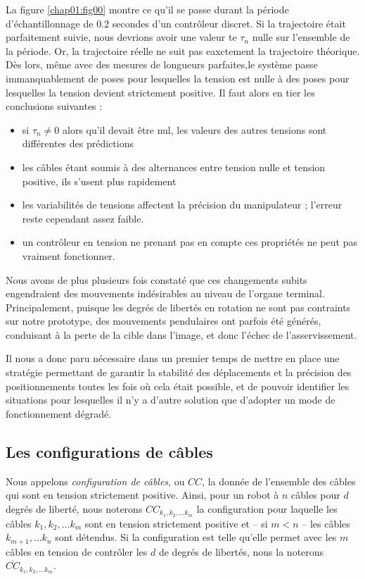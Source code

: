 La figure \ref{chap01:fig00} montre ce qu'il se passe durant la période 
d'échantillonnage de $0.2$ secondes d'un contrôleur discret. Si la trajectoire 
était parfaitement suivie, nous devrions avoir une valeur te $\tau_n$ nulle sur 
l'ensemble de la période. Or, la trajectoire réelle ne suit pas eaxctement la 
trajectoire théorique. Dès lors, même avec des mesures de longueurs parfaites,le 
système passe immanquablement de poses pour lesquelles la tension est nulle à 
des poses pour lesquelles la tension devient strictement positive. Il faut alors 
en tier les conclusions suivantes :
\begin{itemize}
 \item si $\tau_n \neq 0$ alors qu'il devait être nul, les valeurs des autres 
tensions sont différentes des prédictions 
  \item les câbles étant soumis à des 
alternances entre tension nulle et tension positive, ils s'usent plus rapidement
 \item les variabilités de tensions affectent la précision du manipulateur 
; l'erreur reste cependant assez faible.
 \item un contrôleur en tension ne prenant pas en compte ces propriétés ne peut 
pas vraiment fonctionner.
\end{itemize}

Nous avons de plus plusieurs fois constat\'e que ces changements subits engendraient des
mouvements ind\'esirables au niveau de l'organe terminal. Principalement,
puisque les degr\'es de libert\'es en rotation ne sont pas contraints sur notre
prototype, des mouvements pendulaires ont parfois \'et\'e g\'en\'er\'es,
conduisant \`a la perte de la cible dans l'image, et donc l'\'echec de
l'asservissement.

Il nous a donc paru n\'ecessaire dans un premier temps de mettre en place une
strat\'egie permettant de garantir la stabilit\'e des d\'eplacements et la
pr\'ecision des positionnements toutes les fois o\`u cela \'etait possible, et
de pouvoir identifier les situations pour lesquelles il n'y a d'autre solution
que d'adopter un mode de fonctionnement d\'egrad\'e.

\subsection{Les configurations de c\^ables}

Nous appelons {\it configuration de c\^ables}, ou $CC$, la donn\'ee de
l'ensemble des c\^ables qui sont en tension strictement positive. Ainsi, pour
un robot \`a $n$ c\^ables pour $d$ degr\'es de libert\'e, nous noterons
$CC_{k_1, k_2, \dots k_m}$ la configuration pour laquelle les c\^ables $k_1,
k_2, \dots k_m$ sont en tension strictement positive et -- si $m < n$ --  les
c\^ables $k_{m+1}, \dots k_n$ sont d\'etendus. Si la configuration est telle
qu'elle permet avec les $m$ c\^ables en tension de contr\^oler les $d$ de
degr\'es de libert\'es, nous la noterons $\overline{CC}_{k_1, k_2, \dots k_m}$.


